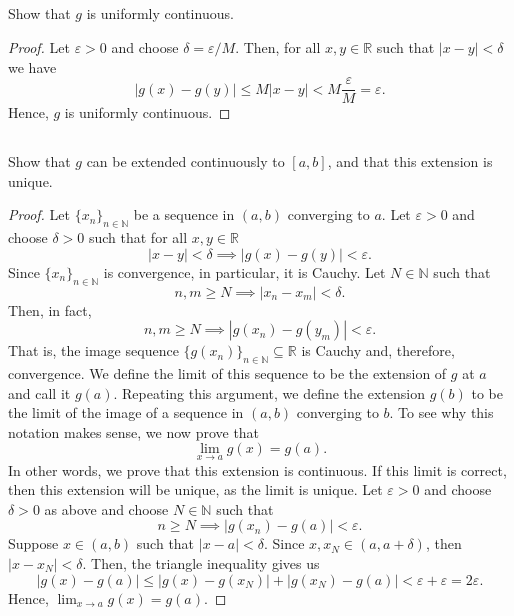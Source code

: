 \documentclass[12pt]{article}
\newenvironment{problem}
    {\begin{lrbox}{\mybox}\begin{minipage}{0.98\textwidth}}
    {\end{minipage}\end{lrbox}\begin{center}\framebox[\textwidth]{\usebox{\mybox}}\end{center}}
\theoremstyle{definition}
\newcommand{\ds}{\displaystyle}
\newcommand{\N}{\mathbb{N}}
\newcommand{\R}{\mathbb{R}}
\newcommand{\eps}{\varepsilon}
\begin{document}
\subsection{}
\begin{problem}
    Show that $g$ is uniformly continuous. 
\end{problem}

\begin{proof}
    Let $\eps > 0$ and choose $\delta = \eps/M$. Then, for all $x, y \in \R$ such that $|x - y| < \delta$ we have
    \[
        |g(x) - g(y)| \leq M|x - y| < M \frac{\eps}{M} = \eps.
    \]
    Hence, $g$ is uniformly continuous. 
    
\end{proof}

\newpage
\subsection{}
\begin{problem}
    Show that $g$ can be extended continuously to $[a,b]$, and that this extension is unique.
\end{problem}

\begin{proof}
    Let $\{x_n\}_{n\in\N}$ be a sequence in $(a,b)$ converging to $a$. Let $\eps > 0$ and choose $\delta > 0$ such that for all $x, y \in \R$
    \[
        |x - y| < \delta \implies |g(x) - g(y)| < \eps.
    \]
    Since $\{x_n\}_{n\in\N}$ is convergence, in particular, it is Cauchy. Let $N \in \N$ such that
    \[
        n, m \geq N \implies |x_n - x_m| < \delta.
    \]
    Then, in fact,
    \[
        n, m \geq N \implies |g(x_n) - g(y_m)| < \eps.
    \]
    That is, the image sequence $\{g(x_n)\}_{n \in \N} \subseteq \R$ is Cauchy and, therefore, convergence. We define the limit of this sequence to be the extension of $g$ at $a$ and call it $g(a)$. Repeating this argument, we define the extension $g(b)$ to be the limit of the image of a sequence in $(a,b)$ converging to $b$. To see why this notation makes sense, we now prove that
    \[
        \lim_{x \to a} g(x) = g(a).
    \]
    In other words, we prove that this extension is continuous. If this limit is correct, then this extension will be unique, as the limit is unique. Let $\eps > 0$ and choose $\delta > 0$ as above and choose $N \in \N$ such that
    \[
        n \geq N \implies |g(x_n) - g(a)| < \eps.
    \]
    Suppose $x \in (a, b)$ such that $|x - a| < \delta$. Since $x, x_N \in (a, a + \delta)$, then $|x - x_N| < \delta$. Then, the triangle inequality gives us
    \[
        |g(x) - g(a)| \leq |g(x) - g(x_N)| + |g(x_N) - g(a)| < \eps + \eps = 2\eps.
    \]
    Hence, $\ds\lim_{x \to a} g(x) = g(a)$.
    
\end{proof}
\end{document}

